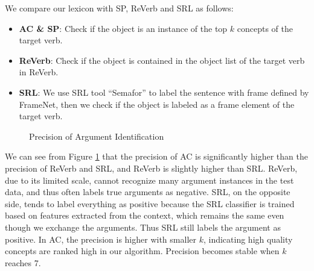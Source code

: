 We compare our lexicon with SP, ReVerb and SRL as follows:
\begin{itemize}
\item {\bf AC \& SP}: Check if the object is an instance of the top $k$ concepts of the target verb.
\item {\bf ReVerb}: Check if the object is contained in the object list of the target verb in ReVerb.
\item {\bf SRL}: We use SRL tool ``Semafor''\cite{chen2010semafor}
to label the sentence with frame defined by FrameNet,
then we check if the object is labeled as a frame element of the target verb.
\end{itemize}

\begin{figure}[th]
\centering
{}
\caption{Precision of Argument Identification}
\label{fig:argumentidentify}
\end{figure}

We can see from Figure \ref{fig:argumentidentify} that
the precision of AC is significantly higher than the precision of ReVerb and SRL,
and ReVerb is slightly higher than SRL.
ReVerb, due to its limited scale,  cannot recognize many argument
instances in the test data, and thus often labels true arguments
as negative. SRL, on the opposite side, tends to label everything
as positive because the SRL classifier is trained based
on features extracted from the context, which remains the same
even though we exchange the arguments. Thus SRL still labels the
argument as positive. In AC, the precision is higher with smaller $k$,
indicating high quality concepts are ranked high in our algorithm.
Precision becomes stable when $k$ reaches 7.

